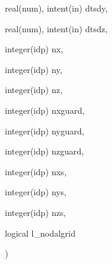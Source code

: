 {\begin{DoxyParamCaption}
\item[{real(num), intent(in)}]{dtsdy, }
\item[{real(num), intent(in)}]{dtsdz, }
\item[{integer(idp)}]{nx, }
\item[{integer(idp)}]{ny, }
\item[{integer(idp)}]{nz, }
\item[{integer(idp)}]{nxguard, }
\item[{integer(idp)}]{nyguard, }
\item[{integer(idp)}]{nzguard, }
\item[{integer(idp)}]{nxs, }
\item[{integer(idp)}]{nys, }
\item[{integer(idp)}]{nzs, }
\item[{logical}]{l\+\_\+nodalgrid}
\end{DoxyParamCaption}
)}\hypertarget{maxwell_8_f90_a6fcc54b9cc2afe01865aab5768f52215}{}\label{maxwell_8_f90_a6fcc54b9cc2afe01865aab5768f52215}
